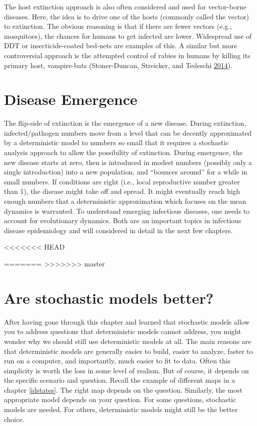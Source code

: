 \documentclass[]{book}
\theoremstyle{definition}
\theoremstyle{definition}
\theoremstyle{definition}
\theoremstyle{remark}
\begin{document}
The host extinction approach is also often considered and used for
vector-borne diseases. Here, the idea is to drive one of the hosts
(commonly called the vector) to extinction. The obvious reasoning is
that if there are fewer vectors (e.g., mosquitoes), the chances for
humans to get infected are lower. Widespread use of DDT or
insecticide-coated bed-nets are examples of this. A similar but more
controversial approach is the attempted control of rabies in humans by
killing its primary host, vampire-bats (Stoner-Duncan, Streicker, and
Tedeschi \protect\hyperlink{ref-stoner-duncan14}{2014}).

\hypertarget{disease-emergence}{%
\section{Disease Emergence}\label{disease-emergence}}

The flip-side of extinction is the emergence of a new disease. During
extinction, infected/pathogen numbers move from a level that can be
decently approximated by a deterministic model to numbers so small that
it requires a stochastic analysis approach to allow the possibility of
extinction. During emergence, the new disease starts at zero, then is
introduced in modest numbers (possibly only a single introduction) into
a new population, and ``bounces around'' for a while in small numbers.
If conditions are right (i.e., local reproductive number greater than
1), the disease might take off and spread. It might eventually reach
high enough numbers that a deterministic approximation which focuses on
the mean dynamics is warranted. To understand emerging infectious
diseases, one needs to account for evolutionary dynamics. Both are an
important topics in infectious disease epidemiology and will considered
in detail in the next few chapters.

<<<<<<< HEAD
\hypertarget{are-stochastic-models-better}{%
=======
>>>>>>> master
\section{Are stochastic models
better?}\label{are-stochastic-models-better}}

After having gone through this chapter and learned that stochastic
models allow you to address questions that deterministic models cannot
address, you might wonder why we should still use deterministic models
at all. The main reasons are that deterministic models are generally
easier to build, easier to analyze, faster to run on a computer, and
importantly, much easier to fit to data. Often this simplicity is worth
the loss in some level of realism. But of course, it depends on the
specific scenario and question. Recall the example of different maps in
a chapter \ref{idstates}. The right map depends on the question.
Similarly, the most appropriate model depends on your question. For some
questions, stochastic models are needed. For others, deterministic
models might still be the better choice.
\end{document}
